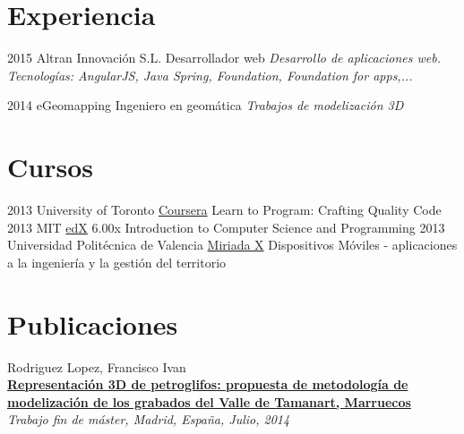 \documentclass[]{friggeri-cv}
\begin{document}
\section{Experiencia}

\begin{entrylist}
  \entry
    {2015}
    {Altran Innovación S.L.}
    {Desarrollador web}
    {\emph{Desarrollo de aplicaciones web. Tecnologías: AngularJS, Java Spring, Foundation, Foundation for apps,...}}
\end{entrylist}

\begin{entrylist}
  \entry
    {2014}
    {eGeomapping}
    {Ingeniero en geomática}
    {\emph{Trabajos de modelización 3D}}
\end{entrylist}

\section{Cursos}

\begin{entrylist}
  \entry
    {2013}
    {University of Toronto}
    {\href{https://www.coursera.org/course/programming2}{Coursera}}
    {Learn to Program: Crafting Quality Code}
  \entry
    {2013}
    {MIT}
    {\href{https://courses.edx.org/courses/MITx/6.00x/2013_Spring/info}{edX}}
    {6.00x Introduction to Computer Science and Programming}
  \entry
    {2013}
    {Universidad Politécnica de Valencia}
    {\href{http://miriadax.net/web/dispositivos_moviles}{Miriada X}}
    {Dispositivos Móviles - aplicaciones a la ingeniería y la gestión del territorio}
\end{entrylist}

\section{Publicaciones}
Rodriguez Lopez, Francisco Ivan\\
\textbf{{\href{http://oa.upm.es/30703/}{Representación 3D de petroglifos: propuesta de metodología de modelización de los grabados del Valle de Tamanart, Marruecos}}}\\
\emph{Trabajo fin de máster, Madrid, España, Julio, 2014}
\end{document}
